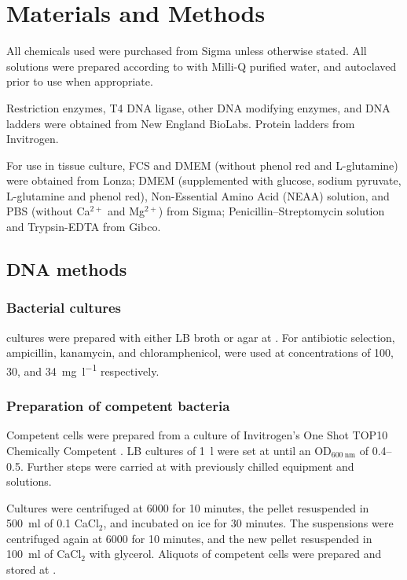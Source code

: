 \chapter{Materials and Methods}
\label{ch:methods}


  All chemicals used were purchased from Sigma unless otherwise stated. All
  solutions were prepared according to  with Milli-Q
  purified water, and autoclaved prior to use when appropriate.

  Restriction enzymes, T4 DNA ligase, other DNA modifying enzymes, and DNA
  ladders were obtained from New England BioLabs. Protein ladders from Invitrogen.

  For use in tissue culture, FCS and DMEM (without phenol red and L-glutamine)
  were obtained from Lonza; DMEM (supplemented with glucose, sodium pyruvate,
  L-glutamine and phenol red), Non-Essential Amino Acid (NEAA) solution, and
  PBS (without Ca$^{2+}$ and Mg$^{2+}$) from Sigma; Penicillin--Streptomycin
  solution and Trypsin-EDTA from Gibco.

  \section{DNA methods}
    \subsection{Bacterial cultures}
       cultures were prepared with either LB broth or agar
      at . For antibiotic selection, ampicillin, kanamycin, and
      chloramphenicol, were used at concentrations of 100, 30,
      and \SI{34}{\mg\per\l} respectively.

    \subsection{Preparation of competent bacteria}
      Competent  cells were prepared from a culture of
      Invitrogen's One Shot TOP10 Chemically Competent . LB
      cultures of \SI{1}{\l} were set at  until an OD$_{\SI{600}{\nm}}$
      of \numrange{0.4}{0.5}. Further steps were carried at  with
      previously chilled equipment and solutions.

      Cultures were centrifuged at \SI{6000}{\gn} for 10 minutes, the
      pellet resuspended in \SI{500}{\ml} of \SI{0.1}{\mM} CaCl$_2$, and
      incubated on ice for 30 minutes. The suspensions were centrifuged
      again at \SI{6000}{\gn} for 10 minutes, and the new pellet resuspended in
      \SI{100}{\ml} of CaCl$_2$ with  glycerol. Aliquots of
      competent cells were prepared and stored at .

